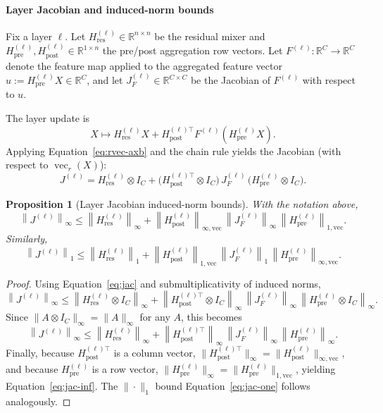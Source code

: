 \documentclass[11pt]{article}
\numberwithin{equation}{section}
\theoremstyle{plain}
\newtheorem{proposition}[theorem]{Proposition}
\theoremstyle{definition}
\theoremstyle{remark}
\newcommand{\R}{\mathbb{R}}
\newcommand{\norm}[1]{\left\lVert #1 \right\rVert}
\newcommand{\Hres}{H_{\mathrm{res}}}
\newcommand{\Hpre}{H_{\mathrm{pre}}}
\newcommand{\Hpost}{H_{\mathrm{post}}}
\newcommand{\vecop}{\operatorname{vec}}
\begin{document}
\paragraph{Layer Jacobian and induced-norm bounds} 
Fix a layer $\ell$. Let $\Hres^{(\ell)}\in\R^{n\times n}$ be the residual mixer and
$\Hpre^{(\ell)},\Hpost^{(\ell)}\in\R^{1\times n}$ the pre/post aggregation row vectors.
Let $F^{(\ell)}:\R^{C}\to\R^{C}$ denote the feature map applied to the aggregated feature vector
$u:=\Hpre^{(\ell)}X\in\R^{C}$, and let $J_F^{(\ell)}\in\R^{C\times C}$ be the Jacobian of $F^{(\ell)}$ with respect to $u$.

The layer update is
\begin{equation}
X \mapsto \Hres^{(\ell)}X + \Hpost^{(\ell)\top}F^{(\ell)}(\Hpre^{(\ell)}X).
\end{equation}
Applying Equation~\eqref{eq:rvec-axb} and the chain rule yields the Jacobian (with respect to $\vecop_r(X)$):
\begin{equation}\label{eq:jac}
J^{(\ell)}
=
\Hres^{(\ell)}\otimes I_C
+
\big(\Hpost^{(\ell)\top}\otimes I_C\big)\,
J_F^{(\ell)}\,
\big(\Hpre^{(\ell)}\otimes I_C\big).
\end{equation}

\begin{proposition}[Layer Jacobian induced-norm bounds]\label{thm:full-jac}
With the notation above,
\begin{equation}\label{eq:jac-inf}
\norm{J^{(\ell)}}_{\infty}
\le
\norm{\Hres^{(\ell)}}_{\infty}
+
\norm{\Hpost^{(\ell)}}_{\infty,\mathrm{vec}}\,
\norm{J_F^{(\ell)}}_{\infty}\,
\norm{\Hpre^{(\ell)}}_{1,\mathrm{vec}}.
\end{equation}
Similarly,
\begin{equation}\label{eq:jac-one}
\norm{J^{(\ell)}}_{1}
\le
\norm{\Hres^{(\ell)}}_{1}
+
\norm{\Hpost^{(\ell)}}_{1,\mathrm{vec}}\,
\norm{J_F^{(\ell)}}_{1}\,
\norm{\Hpre^{(\ell)}}_{\infty,\mathrm{vec}}.
\end{equation}
\end{proposition}

\begin{proof}
Using Equation~\eqref{eq:jac} and submultiplicativity of induced norms,
\begin{equation}
\norm{J^{(\ell)}}_\infty
\le
\norm{\Hres^{(\ell)}\otimes I_C}_\infty
+
\norm{\Hpost^{(\ell)\top}\otimes I_C}_\infty\,
\norm{J_F^{(\ell)}}_\infty\,
\norm{\Hpre^{(\ell)}\otimes I_C}_\infty.
\end{equation}
Since $\|A\otimes I_C\|_\infty=\|A\|_\infty$ for any $A$, this becomes
\begin{equation}
\norm{J^{(\ell)}}_\infty
\le
\norm{\Hres^{(\ell)}}_\infty
+
\norm{\Hpost^{(\ell)\top}}_\infty\,
\norm{J_F^{(\ell)}}_\infty\,
\norm{\Hpre^{(\ell)}}_\infty.
\end{equation}
Finally, because $\Hpost^{(\ell)\top}$ is a column vector,
$\|\Hpost^{(\ell)\top}\|_\infty=\|\Hpost^{(\ell)}\|_{\infty,\mathrm{vec}}$, and because $\Hpre^{(\ell)}$ is a row vector,
$\|\Hpre^{(\ell)}\|_\infty=\|\Hpre^{(\ell)}\|_{1,\mathrm{vec}}$, yielding Equation~\eqref{eq:jac-inf}. The $\|\cdot\|_1$ bound
Equation~\eqref{eq:jac-one} follows analogously.
\end{proof}
\end{document}
